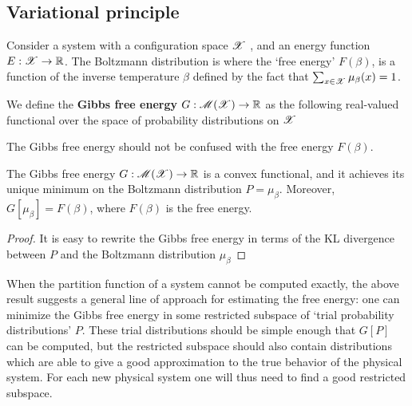 \documentclass[letterpaper,english,10pt]{article}
\begin{document}
\subsection{Variational principle}
Consider a system with a configuration space $\mathscr{X}$ , and an energy function $E: \mathscr{X} \to \mathbb{R}$. 
The Boltzmann distribution is 
where the `free energy' $F(\beta)$, is a function of the inverse temperature $\beta$ defined by the fact that $\sum_{x \in \mathscr{X}} \mu_\beta(x) = 1$. 
\begin{defn}
We define the \textbf{Gibbs free energy} $G: \mathscr{M}(\mathscr{X}) \to \mathbb{R}$ as the following real-valued functional over the space of probability distributions on $\mathscr{X}$
\end{defn}
The Gibbs free energy should not be confused with the free energy $F(\beta)$. 
\begin{prop}
The Gibbs free energy $G: \mathscr{M}(\mathscr{X}) \to \mathbb{R}$ is a convex functional, 
and it achieves its unique minimum on the Boltzmann distribution $P = \mu_\beta$. 
Moreover, $G[\mu_\beta] = F(\beta)$, where $F(\beta)$ is the free energy.
\end{prop}
\begin{proof}
It is easy to rewrite the Gibbs free energy in terms of the KL divergence between $P$ and the Boltzmann distribution $\mu_\beta$
\end{proof}

When the partition function of a system cannot be computed exactly, the above result suggests a general line of approach for estimating the free energy: one can minimize the Gibbs free energy in some restricted subspace of `trial probability distributions' $P$.  
These trial distributions should be simple enough that $G[P]$ can be computed, 
but the restricted subspace should also contain distributions which are able to give a good approximation to the true behavior of the physical system. 
For each new physical system one will thus need to find a good restricted subspace. 
\end{document}
